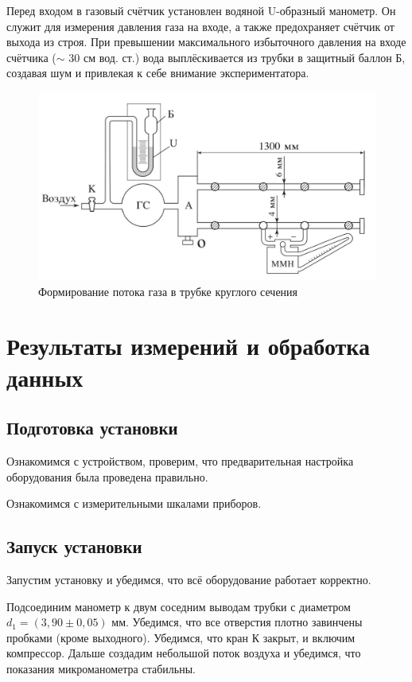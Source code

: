 \documentclass[a4paper,12pt]{article}
\begin{document}
Перед входом в газовый счётчик установлен водяной U-образный манометр. Он служит для измерения давления газа на входе, а также предохраняет счётчик от выхода из строя. При превышении максимального избыточного давления на входе счётчика ($\sim$ 30 см вод. ст.) вода выплёскивается из трубки в защитный баллон Б, создавая шум и привлекая к себе внимание экспериментатора.

\begin{figure}[!h]
    \includegraphics[width=0.8\linewidth]{ustan.png}
    \centering
    \caption{Формирование потока газа в трубке круглого сечения}
    \label{ustan}
\end{figure}

\newpage

\section{Результаты измерений и обработка данных}

\subsection{Подготовка установки}

Ознакомимся с устройством, проверим, что предварительная настройка оборудования была проведена правильно.

Ознакомимся с измерительными шкалами приборов.

\subsection{Запуск установки}

Запустим установку и убедимся, что всё оборудование работает корректно.

Подсоединим манометр к двум соседним выводам трубки с диаметром $d_1 = (3,90 \pm 0,05)$ мм. Убедимся, что все отверстия плотно завинчены пробками (кроме выходного). Убедимся, что кран К закрыт, и включим компрессор. Дальше создадим небольшой поток воздуха и убедимся, что показания микроманометра стабильны.
\end{document}
